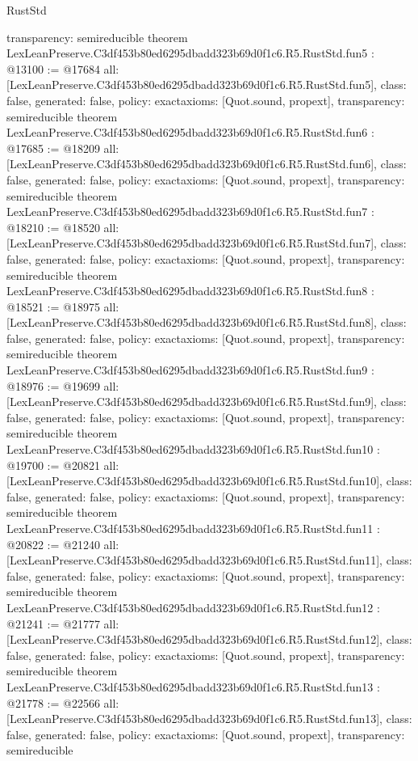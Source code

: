 \begin{lexlean}{RustStd}
\begin{coremodule}
{  transparency: semireducible
}
theorem LexLeanPreserve.C3df453b80ed6295dbadd323b69d0f1c6.R5.RustStd.fun5 : @13100 := @17684 {
  all: [LexLeanPreserve.C3df453b80ed6295dbadd323b69d0f1c6.R5.RustStd.fun5],
  class: false,
  generated: false,
  policy: exact{axioms: [Quot.sound, propext]},
  transparency: semireducible
}
theorem LexLeanPreserve.C3df453b80ed6295dbadd323b69d0f1c6.R5.RustStd.fun6 : @17685 := @18209 {
  all: [LexLeanPreserve.C3df453b80ed6295dbadd323b69d0f1c6.R5.RustStd.fun6],
  class: false,
  generated: false,
  policy: exact{axioms: [Quot.sound, propext]},
  transparency: semireducible
}
theorem LexLeanPreserve.C3df453b80ed6295dbadd323b69d0f1c6.R5.RustStd.fun7 : @18210 := @18520 {
  all: [LexLeanPreserve.C3df453b80ed6295dbadd323b69d0f1c6.R5.RustStd.fun7],
  class: false,
  generated: false,
  policy: exact{axioms: [Quot.sound, propext]},
  transparency: semireducible
}
theorem LexLeanPreserve.C3df453b80ed6295dbadd323b69d0f1c6.R5.RustStd.fun8 : @18521 := @18975 {
  all: [LexLeanPreserve.C3df453b80ed6295dbadd323b69d0f1c6.R5.RustStd.fun8],
  class: false,
  generated: false,
  policy: exact{axioms: [Quot.sound, propext]},
  transparency: semireducible
}
theorem LexLeanPreserve.C3df453b80ed6295dbadd323b69d0f1c6.R5.RustStd.fun9 : @18976 := @19699 {
  all: [LexLeanPreserve.C3df453b80ed6295dbadd323b69d0f1c6.R5.RustStd.fun9],
  class: false,
  generated: false,
  policy: exact{axioms: [Quot.sound, propext]},
  transparency: semireducible
}
theorem LexLeanPreserve.C3df453b80ed6295dbadd323b69d0f1c6.R5.RustStd.fun10 : @19700 := @20821 {
  all: [LexLeanPreserve.C3df453b80ed6295dbadd323b69d0f1c6.R5.RustStd.fun10],
  class: false,
  generated: false,
  policy: exact{axioms: [Quot.sound, propext]},
  transparency: semireducible
}
theorem LexLeanPreserve.C3df453b80ed6295dbadd323b69d0f1c6.R5.RustStd.fun11 : @20822 := @21240 {
  all: [LexLeanPreserve.C3df453b80ed6295dbadd323b69d0f1c6.R5.RustStd.fun11],
  class: false,
  generated: false,
  policy: exact{axioms: [Quot.sound, propext]},
  transparency: semireducible
}
theorem LexLeanPreserve.C3df453b80ed6295dbadd323b69d0f1c6.R5.RustStd.fun12 : @21241 := @21777 {
  all: [LexLeanPreserve.C3df453b80ed6295dbadd323b69d0f1c6.R5.RustStd.fun12],
  class: false,
  generated: false,
  policy: exact{axioms: [Quot.sound, propext]},
  transparency: semireducible
}
theorem LexLeanPreserve.C3df453b80ed6295dbadd323b69d0f1c6.R5.RustStd.fun13 : @21778 := @22566 {
  all: [LexLeanPreserve.C3df453b80ed6295dbadd323b69d0f1c6.R5.RustStd.fun13],
  class: false,
  generated: false,
  policy: exact{axioms: [Quot.sound, propext]},
  transparency: semireducible
}
\end{coremodule}
\end{lexlean}
